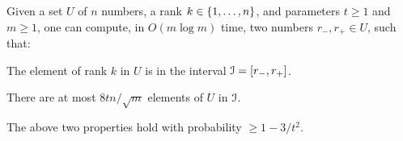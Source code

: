 \begin{lemma}
    Given a set $U$ of $n$ numbers, a rank $k \in \left\{ {1, \dots, n} \right\}$, and
    parameters $t \geq 1$ and $m \geq 1$, one can compute, in
    $O(m \log m)$ time, two numbers $r_{-}, r_+ \in U$, such that:
    \begin{compactenumA}
        \medskip%
        \item The element of rank $k$ in $U$ is in the interval
        $\EuScript{I} = [r_-, r_+]$.  \smallskip%
        \smallskip%
        \item There are at most $8 t {n}/ \sqrt{m}$ elements of $U$ in
        $\EuScript{I}$.
    \end{compactenumA}
    \medskip%
    The above two properties hold with probability $\geq 1-3/t^2$.
\end{lemma}
